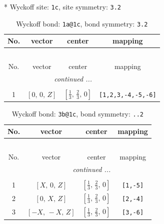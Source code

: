 \documentclass[fleqn,8pt]{jsarticle}
\begin{document}
* Wyckoff site: {\tt 1c}, site symmetry: {\tt 3.2}
\renewcommand{\arraystretch}{1.2}
\begin{longtable}{cccc}
\caption{Wyckoff bond: {\tt 1a@1c}, bond symmetry: {\tt 3.2}}
 \\
 \hline \hline
No. & vector & center & mapping \\ \hline \endfirsthead

\multicolumn{3}{l}{\tablename\ \thetable{}} \\
 \hline \hline
No. & vector & center & mapping \\ \hline \endhead

 \hline \hline
\multicolumn{3}{r}{\footnotesize\it continued ...} \\ \endfoot

 \hline \hline
\multicolumn{3}{r}{} \\ \endlastfoot

1 & $\left[ 0,\, 0,\, Z \right]$ & $\left[ \frac{1}{3},\, \frac{2}{3},\, 0 \right]$ & {\tt [1,2,3,-4,-5,-6]} \\
\end{longtable}
\renewcommand{\arraystretch}{1.2}
\begin{longtable}{cccc}
\caption{Wyckoff bond: {\tt 3b@1c}, bond symmetry: {\tt ..2}}
 \\
 \hline \hline
No. & vector & center & mapping \\ \hline \endfirsthead

\multicolumn{3}{l}{\tablename\ \thetable{}} \\
 \hline \hline
No. & vector & center & mapping \\ \hline \endhead

 \hline \hline
\multicolumn{3}{r}{\footnotesize\it continued ...} \\ \endfoot

 \hline \hline
\multicolumn{3}{r}{} \\ \endlastfoot

1 & $\left[ X,\, 0,\, Z \right]$ & $\left[ \frac{1}{3},\, \frac{2}{3},\, 0 \right]$ & {\tt [1,-5]} \\ \hline
2 & $\left[ 0,\, X,\, Z \right]$ & $\left[ \frac{1}{3},\, \frac{2}{3},\, 0 \right]$ & {\tt [2,-4]} \\ \hline
3 & $\left[ - X,\, - X,\, Z \right]$ & $\left[ \frac{1}{3},\, \frac{2}{3},\, 0 \right]$ & {\tt [3,-6]} \\
\end{longtable}
\renewcommand{\arraystretch}{1.2}
\end{document}
